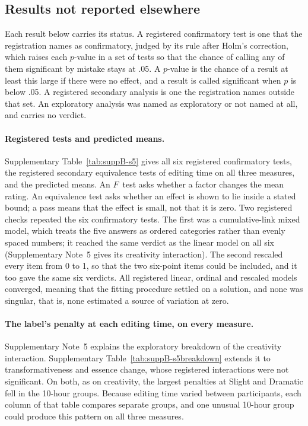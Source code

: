 \subsection*{Results not reported elsewhere}

Each result below carries its status. A registered confirmatory test is one that the registration names as confirmatory, judged by its rule after Holm's correction, which raises each $p$-value in a set of tests so that the chance of calling any of them significant by mistake stays at .05. A $p$-value is the chance of a result at least this large if there were no effect, and a result is called significant when $p$ is below .05. A registered secondary analysis is one the registration names outside that set. An exploratory analysis was named as exploratory or not named at all, and carries no verdict.

\paragraph*{Registered tests and predicted means.}
Supplementary Table~\ref{tab:suppB-s5} gives all six registered confirmatory tests, the registered secondary equivalence tests of editing time on all three measures, and the predicted means. An $F$~test asks whether a factor changes the mean rating. An equivalence test asks whether an effect is shown to lie inside a stated bound; a pass means that the effect is small, not that it is zero. Two registered checks repeated the six confirmatory tests. The first was a cumulative-link mixed model, which treats the five answers as ordered categories rather than evenly spaced numbers; it reached the same verdict as the linear model on all six (Supplementary Note~5 gives its creativity interaction). The second rescaled every item from 0 to 1, so that the two six-point items could be included, and it too gave the same six verdicts. All registered linear, ordinal and rescaled models converged, meaning that the fitting procedure settled on a solution, and none was singular, that is, none estimated a source of variation at zero.



\paragraph*{The label's penalty at each editing time, on every measure.}
Supplementary Note~5 explains the exploratory breakdown of the creativity interaction. Supplementary Table~\ref{tab:suppB-s5breakdown} extends it to transformativeness and essence change, whose registered interactions were not significant. On both, as on creativity, the largest penalties at Slight and Dramatic fell in the 10-hour groups. Because editing time varied between participants, each column of that table compares separate groups, and one unusual 10-hour group could produce this pattern on all three measures.


